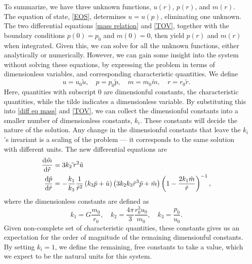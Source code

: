 To summarize, we have three unknown functions, $u(r)$, $p(r)$, and $m(r)$.
The equation of state, \autoref{EOS}, determines $u = u(p)$, eliminating one unknown.
The two differential equations \autoref{mass relation} and \autoref{TOV}, together with the boundary conditions $p(0) = p_0$ and $m(0) = 0$, then yield $p(r)$ and $m(r)$ when integrated.
Given this, we can solve for all the unknown functions, either analytically or numerically.
However, we can gain some insight into the system without solving these equations, by expressing the problem in terms of dimensionless variables, and corresponding characteristic quantities.
We define
%
\begin{equation}
    u = u_0 \tilde u, \quad 
    p = p_0 \tilde p, \quad 
    m = m_0 \tilde m, \quad 
    r = r_0 \tilde r.
\end{equation}
%
Here, quantities with subscript $0$ are dimensionful constants, the characteristic quantities, while the tilde indicates a dimensionless variable.
By substituting this into \autoref{diff eq mass} and \autoref{TOV}, we can collect the dimensionful constants into a smaller number of dimensionless constants, $k_i$.
These constants will decide the nature of the solution.
Any change in the dimensionful constants that leave the $k_i$'s invariant is a scaling of the problem --- it corresponds to the same solution with different units.
The new differential equations are
%
\begin{align}
    \label{mass relation dimensionless}
    \diff{ \tilde m}{\tilde r} & = 3 k_2 \tilde \, r^2 \tilde u \\
    \label{TOV dimensionless}
    \diff{\tilde p}{\tilde r} & 
    = - \frac{k_1}{k_3} \frac{1}{\tilde r^2} \left(k_3\tilde p + \tilde u\right) \left(3 k_2 k_3  \tilde r^3 \tilde p + \tilde m\right) 
    \left(1 - \frac{2 k_1  \tilde m}{\tilde r}\right)^{-1},
\end{align}
%
where the dimensionless constants are defined as
%
\begin{equation}
    \label{dimensionless groups}
    k_1 = G \frac{m_0}{r_0}, \quad 
    k_2 =  \frac{4 \pi}{3} \frac{r_0^3 u_0}{m_0}, \quad
    k_3 = \frac{p_0}{u_0}.
\end{equation}
%
Given non-complete set of characteristic quantities, these constants gives us an expectation for the order of magnitude of the remaining dimensionful constants.
By setting $k_i = 1$, we define the remaining, free constants to take a value, which we expect to be the natural units for this system.


